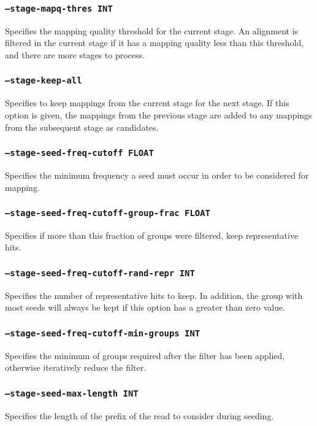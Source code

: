 \documentclass[a4paper,12pt]{book}
\newcommand{\TT}[1]{{\tt #1}} %
\begin{document}
\subsubsection{\TT{--stage-mapq-thres INT}}
Specifies the mapping quality threshold for the current stage.
An alignment is filtered in the current stage if it has a mapping quality less than this threshold, and there are more stages to process.
\subsubsection{\TT{--stage-keep-all}}
Specifies to keep mappings from the current stage for the next stage.
If this option is given, the mappings from the previous stage are added to any mappings from the subsequent stage as candidates.

\subsubsection{\TT{--stage-seed-freq-cutoff FLOAT}}
Specifies the minimum frequency a seed must occur in order to be considered for mapping.

\subsubsection{\TT{--stage-seed-freq-cutoff-group-frac FLOAT}}
Specifies if more than this fraction of groups were filtered, keep representative hits.
                  
\subsubsection{\TT{--stage-seed-freq-cutoff-rand-repr INT}}
Specifies the number of representative hits to keep.
In addition, the group with most seeds will always be kept if this option has a greater than zero value.

\subsubsection{\TT{--stage-seed-freq-cutoff-min-groups INT}}
Specifies the minimum of groups required after the filter has been applied, otherwise iteratively reduce the filter.

\subsubsection{\TT{--stage-seed-max-length INT}}
Specifies the length of the prefix of the read to consider during seeding.
\end{document}
